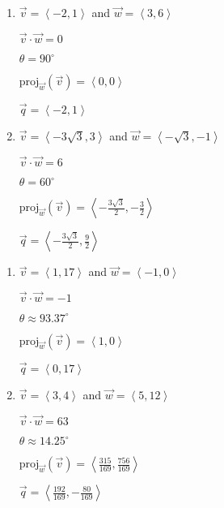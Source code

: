 \documentclass{ximera}
\begin{document}
 \begin{multicols}{2} \raggedcolumns 
\begin{enumerate}
\setcounter{enumi}{\value{HW}}
\item $\vec{v} = \left\langle -2,1 \right\rangle$ and $\vec{w} = \left\langle 3,6 \right\rangle$

 $\vec{v} \cdot \vec{w} = 0$

 $\theta =  90^{\circ}$ 

 $\text{proj}_{\vec{w}}(\vec{v}) = \left\langle 0, 0 \right\rangle$

 $\vec{q} = \left\langle -2, 1 \right\rangle$
 
 \vfill
 
\item $\vec{v} = \left\langle -3\sqrt{3}, 3\right\rangle$ and $\vec{w} = \left\langle -\sqrt{3}, -1 \right\rangle$

 $\vec{v} \cdot \vec{w} = 6$

 $\theta =  60^{\circ}$ 

 $\text{proj}_{\vec{w}}(\vec{v}) = \left\langle -\frac{3\sqrt{3}}{2}, -\frac{3}{2} \right\rangle$

 $\vec{q} = \left\langle -\frac{3\sqrt{3}}{2}, \frac{9}{2} \right\rangle$ 

 
\setcounter{HW}{\value{enumi}}
\end{enumerate}
\end{multicols}
 
 
\begin{multicols}{2} \raggedcolumns 
\begin{enumerate}
\setcounter{enumi}{\value{HW}}


\item $\vec{v} = \left\langle 1, 17 \right\rangle$ and $\vec{w} = \left\langle -1, 0 \right\rangle$

 $\vec{v} \cdot \vec{w} = -1$

 $\theta \approx  93.37^{\circ}$ 

 $\text{proj}_{\vec{w}}(\vec{v}) = \left\langle 1, 0 \right\rangle$

 $\vec{q} = \left\langle 0, 17 \right\rangle$

\vfill

\item $\vec{v} = \left\langle 3, 4 \right\rangle$ and $\vec{w} = \left\langle 5, 12 \right\rangle$

 $\vec{v} \cdot \vec{w} = 63$

 $\theta  \approx  14.25^{\circ}$ 

 $\text{proj}_{\vec{w}}(\vec{v}) = \left\langle \frac{315}{169}, \frac{756}{169} \right\rangle$

 $\vec{q} = \left\langle \frac{192}{169}, -\frac{80}{169} \right\rangle$
 
\setcounter{HW}{\value{enumi}}
\end{enumerate}
\end{multicols}
 
\end{document}

